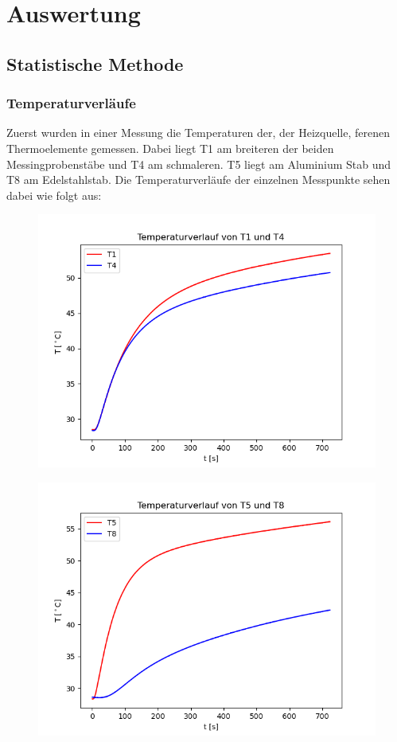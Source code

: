 \section{Auswertung}

\subsection{Statistische Methode}

\subsubsection{Temperaturverläufe}

Zuerst wurden in einer Messung die Temperaturen der, der Heizquelle, ferenen Thermoelemente gemessen. Dabei liegt T1 am breiteren der beiden Messingprobenstäbe und T4 am schmaleren. T5 liegt am Aluminium Stab und T8 am Edelstahlstab. Die Temperaturverläufe der einzelnen Messpunkte sehen dabei wie folgt aus:

\begin{figure}[H]
    \centering
    \includegraphics{1.png}
\end{figure}

\begin{figure}[H]
    \centering
    \includegraphics{2.png}
\end{figure}

